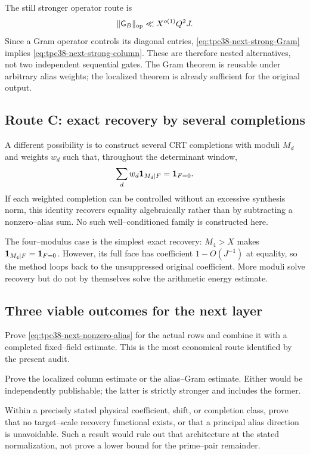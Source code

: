The still stronger operator route is
\begin{equation}
 \|\mathsf G_B\|_{\operatorname{op}}\ll X^{o(1)}Q^2J.
 \label{eq:tpc38-next-strong-Gram}
\end{equation}
Since a Gram operator controls its diagonal entries,
\eqref{eq:tpc38-next-strong-Gram} implies
\eqref{eq:tpc38-next-strong-column}.  These are therefore nested
alternatives, not two independent sequential gates.  The Gram theorem is
reusable under arbitrary alias weights; the localized theorem is already
sufficient for the original output.

\subsection{Route C: exact recovery by several completions}

A different possibility is to construct several CRT completions with
moduli \(M_d\) and weights \(w_d\) such that, throughout the determinant
window,
\begin{equation}
 \sum_d w_d\mathbf 1_{M_d\mid F}=\mathbf 1_{F=0}.
 \label{eq:tpc38-multi-completion-recovery}
\end{equation}
If each weighted completion can be controlled without an excessive
synthesis norm, this identity recovers equality algebraically rather than
by subtracting a nonzero--alias sum.  No such well--conditioned family is
constructed here.

The four--modulus case is the simplest exact recovery:
\(M_4>X\) makes \(\mathbf 1_{M_4\mid F}=\mathbf 1_{F=0}\).  However, its full face
has coefficient \(1-O(J^{-1})\) at equality, so the method loops back to
the unsuppressed original coefficient.  More moduli solve recovery but do
not by themselves solve the arithmetic energy estimate.

\subsection{Three viable outcomes for the next layer}

\begin{description}[style=nextline,leftmargin=1.8em]
 \item[Positive aggregate recovery theorem.]
 Prove \eqref{eq:tpc38-next-nonzero-alias} for the actual rows and combine
 it with a completed fixed--field estimate.  This is the most economical
 route identified by the present audit.

 \item[Positive strong theorem.]
 Prove the localized column estimate or the alias--Gram estimate.  Either
 would be independently publishable; the latter is strictly stronger and
 includes the former.

 \item[Scoped obstruction or recovery no--go.]
 Within a precisely stated physical coefficient, shift, or completion
 class, prove that no target--scale recovery functional exists, or that a
 principal alias direction is unavoidable.  Such a result would rule out
 that architecture at the stated normalization, not prove a lower bound
 for the prime--pair remainder.
\end{description}

